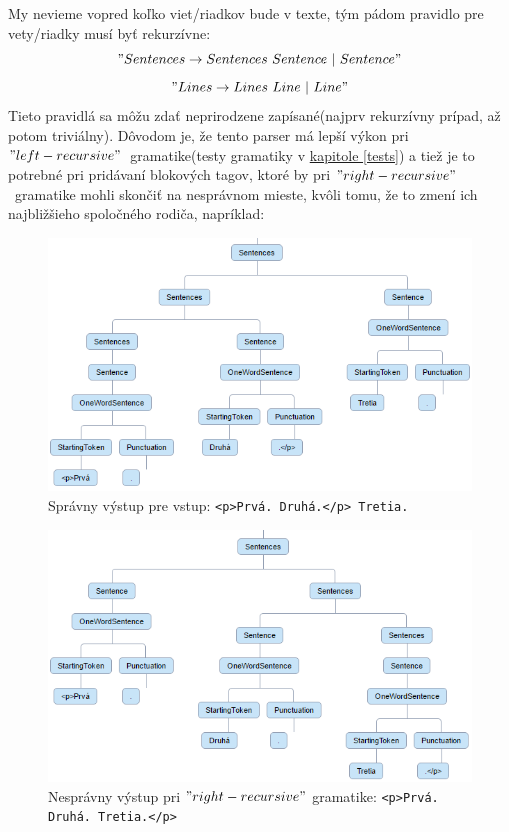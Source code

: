 \documentclass[12pt,a4paper]{report}
\theoremstyle{definition}
\theoremstyle{remark}
\begin{document}
My nevieme vopred koľko viet/riadkov bude v texte, tým pádom pravidlo pre vety/riadky musí byť rekurzívne: $$"Sentences \to Sentences \ Sentence \ | \ Sentence"$$  $$"Lines \to Lines \ Line \ | \ Line"$$
Tieto pravidlá sa môžu zdať neprirodzene zapísané(najprv rekurzívny prípad, až potom triviálny). Dôvodom je, že tento parser má lepší výkon pri $"left-recursive"$\  gramatike(testy gramatiky v \hyperref[tests]{kapitole \ref{tests}}) a tiež je to potrebné pri pridávaní blokových tagov, ktoré by pri $"right-recursive"$ \ gramatike mohli skončiť na nesprávnom mieste, kvôli tomu, že to zmení ich najbližšieho spoločného rodiča, napríklad:
\begin{figure}[H]

\includegraphics[scale=2.2]{treePTagsCorrect}
\caption{Správny výstup pre vstup: \texttt{<p>Prvá. Druhá.</p> Tretia.}}
\end{figure}
\begin{figure}[H]
\includegraphics[scale=2.2]{treePTagsIncorrect}
\captionsetup{width=.6\linewidth}
\caption{Nesprávny výstup pri $"right-recursive"$ gramatike: \texttt{<p>Prvá. Druhá. Tretia.</p>}}
\end{figure}
\end{document}
